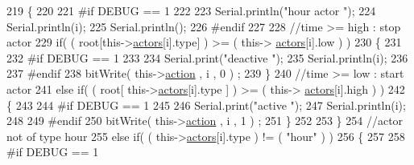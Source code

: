 \begin{DoxyCode}
219                     \{
220                     
221 \textcolor{preprocessor}{                    #if DEBUG == 1}
222                         
223                         Serial.println(\textcolor{stringliteral}{"hour actor "});
224                         Serial.println(i);
225                         Serial.println();
226 \textcolor{preprocessor}{                    #endif}
227 
228                         \textcolor{comment}{//time >= high : stop actor}
229                         \textcolor{keywordflow}{if}( ( root[this->\hyperlink{class_jetpack_a7e16d2f97837f9712a2e6de1c50d99db}{actors}[i].type] ) >= ( this->
      \hyperlink{class_jetpack_a7e16d2f97837f9712a2e6de1c50d99db}{actors}[i].low ) )     
230                         \{
231                         
232 \textcolor{preprocessor}{                        #if DEBUG == 1 }
233                             
234                             Serial.print(\textcolor{stringliteral}{"deactive "});
235                             Serial.println(i);
236                         
237 \textcolor{preprocessor}{                        #endif  }
238                             bitWrite( this->\hyperlink{class_jetpack_aca3142925a7b0834b34ae91d26af7765}{action} , i , 0 ) ;    
239                         \}
240                         \textcolor{comment}{//time >= low : start actor}
241                         \textcolor{keywordflow}{else} \textcolor{keywordflow}{if}( ( root[ this->\hyperlink{class_jetpack_a7e16d2f97837f9712a2e6de1c50d99db}{actors}[i].type ] ) >= ( this->
      \hyperlink{class_jetpack_a7e16d2f97837f9712a2e6de1c50d99db}{actors}[i].high ) )
242                         \{
243                         
244 \textcolor{preprocessor}{                        #if DEBUG == 1 }
245                         
246                             Serial.print(\textcolor{stringliteral}{"active "});
247                             Serial.println(i);
248                         
249 \textcolor{preprocessor}{                        #endif}
250                             bitWrite( this->\hyperlink{class_jetpack_aca3142925a7b0834b34ae91d26af7765}{action} , i , 1 ) ;                    
251                         \}
252                         
253                     \}
254                     \textcolor{comment}{//actor not of type hour}
255                     \textcolor{keywordflow}{else} \textcolor{keywordflow}{if}( ( this->\hyperlink{class_jetpack_a7e16d2f97837f9712a2e6de1c50d99db}{actors}[i].type ) != ( \textcolor{stringliteral}{"hour"} ) )      
256                     \{
257                     
258 \textcolor{preprocessor}{                    #if DEBUG == 1 }

\end{DoxyCode}
